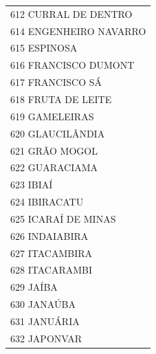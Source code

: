 \documentclass{article}
\begin{document}
\begin{longtable}[c]{m{18cm}}
\multicolumn{1}{l}{ \hspace{2em} 612 CURRAL DE DENTRO } \\
\multicolumn{1}{l}{ \hspace{2em} 614 ENGENHEIRO NAVARRO } \\
\multicolumn{1}{l}{ \hspace{2em} 615 ESPINOSA } \\
\multicolumn{1}{l}{ \hspace{2em} 616 FRANCISCO DUMONT } \\
\multicolumn{1}{l}{ \hspace{2em} 617 FRANCISCO SÁ } \\
\multicolumn{1}{l}{ \hspace{2em} 618 FRUTA DE LEITE } \\
\multicolumn{1}{l}{ \hspace{2em} 619 GAMELEIRAS } \\
\multicolumn{1}{l}{ \hspace{2em} 620 GLAUCILÂNDIA } \\
\multicolumn{1}{l}{ \hspace{2em} 621 GRÃO MOGOL } \\
\multicolumn{1}{l}{ \hspace{2em} 622 GUARACIAMA } \\
\multicolumn{1}{l}{ \hspace{2em} 623 IBIAÍ } \\
\multicolumn{1}{l}{ \hspace{2em} 624 IBIRACATU } \\
\multicolumn{1}{l}{ \hspace{2em} 625 ICARAÍ DE MINAS } \\
\multicolumn{1}{l}{ \hspace{2em} 626 INDAIABIRA } \\
\multicolumn{1}{l}{ \hspace{2em} 627 ITACAMBIRA } \\
\multicolumn{1}{l}{ \hspace{2em} 628 ITACARAMBI } \\
\multicolumn{1}{l}{ \hspace{2em} 629 JAÍBA } \\
\multicolumn{1}{l}{ \hspace{2em} 630 JANAÚBA } \\
\multicolumn{1}{l}{ \hspace{2em} 631 JANUÁRIA } \\
\multicolumn{1}{l}{ \hspace{2em} 632 JAPONVAR } \\

\end{longtable}
\end{document}
